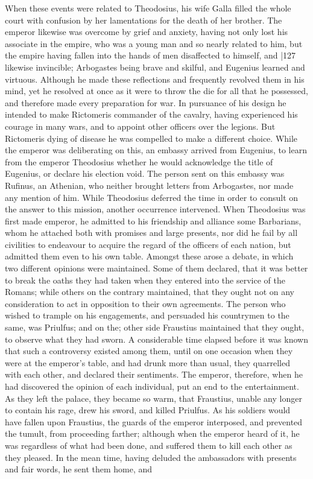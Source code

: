 When these events were related to Theodosius, his wife Galla filled the whole court with confusion by her lamentations for the death of her brother. The emperor likewise was overcome by grief and anxiety, having not only lost his associate in the empire, who was a young man and so nearly related to him, but the empire having fallen into the hands of men disaffected to himself, and
|127
likewise invincible; Arbogastes being brave and skilful, and Eugenius learned and virtuous. Although he made these reflections and frequently revolved them in his mind, yet he resolved at once as it were to throw the die for all that he possessed, and therefore made every preparation for war. In pursuance of his design he intended to make Rictomeris commander of the cavalry, having experienced his courage in many wars, and to appoint other officers over the legions. But Rictomeris dying of disease he was compelled to make a different choice. While the emperor was deliberating on this, an embassy arrived from Eugenius, to learn from the emperor Theodosius whether he would acknowledge the title of Eugenius, or declare his election void. The person sent on this embassy was Rufinus, an Athenian, who neither brought letters from Arbogastes, nor made any mention of him. While Theodosius deferred the time in order to consult on the answer to this mission, another occurrence intervened. When Theodosius was first made emperor, he admitted to his friendship and alliance some Barbarians, whom he attached both with promises and large presents, nor did he fail by all civilities to endeavour to acquire the regard of the officers of each nation, but admitted them even to his own table. Amongst these arose a debate, in which two different opinions were maintained. Some of them declared, that it was better to break the oaths they had taken when they entered into the service of the Romans; while others on the contrary maintained, that they ought not on any consideration to act in opposition to their own agreements. The person who wished to trample on his engagements, and persuaded his countrymen to the same, was Priulfus; and on the; other side Fraustius maintained that they ought, to observe what they had sworn. A considerable time elapsed before it was known that such a controversy existed among them, until on one occasion when they were at the emperor's table, and had drunk more than usual, they quarrelled with each other, and declared their sentiments. The emperor, therefore, when he had discovered the opinion of each individual, put an end to the entertainment. As they left the palace, they became so warm, that Fraustius, unable any longer to contain his rage, drew his sword, and killed Priulfus. As his soldiers would have fallen upon Fraustius, the guards of the emperor interposed, and prevented the tumult, from proceeding farther; although when the emperor heard of it, he was regardless of what had been done, and suffered them to kill each other as they pleased. In the mean time, having deluded the ambassadors with presents and fair words, he sent them home, and
